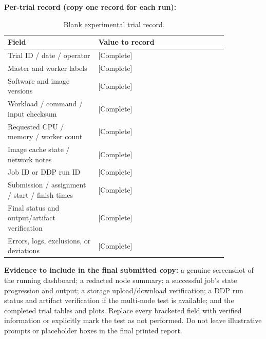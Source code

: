 \documentclass{article}
\begin{document}
\textbf{Per-trial record (copy one record for each run):}
\begin{table}[h!]
\centering
\caption{Blank experimental trial record.}
\label{tab:trial-record}
\begin{tabular}{|p{0.35\linewidth}|p{0.5\linewidth}|}
\hline
Field & Value to record \\
\hline
Trial ID / date / operator & [Complete] \\
\hline
Master and worker labels & [Complete] \\
\hline
Software and image versions & [Complete] \\
\hline
Workload / command / input checksum & [Complete] \\
\hline
Requested CPU / memory / worker count & [Complete] \\
\hline
Image cache state / network notes & [Complete] \\
\hline
Job ID or DDP run ID & [Complete] \\
\hline
Submission / assignment / start / finish times & [Complete] \\
\hline
Final status and output/artifact verification & [Complete] \\
\hline
Errors, logs, exclusions, or deviations & [Complete] \\
\hline
\end{tabular}
\end{table}

\textbf{Evidence to include in the final submitted copy:} a genuine screenshot of the running dashboard; a redacted node summary; a successful job's state progression and output; a storage upload/download verification; a DDP run status and artifact verification if the multi-node test is available; and the completed trial tables and plots. Replace every bracketed field with verified information or explicitly mark the test as not performed. Do not leave illustrative prompts or placeholder boxes in the final printed report.
\end{document}
